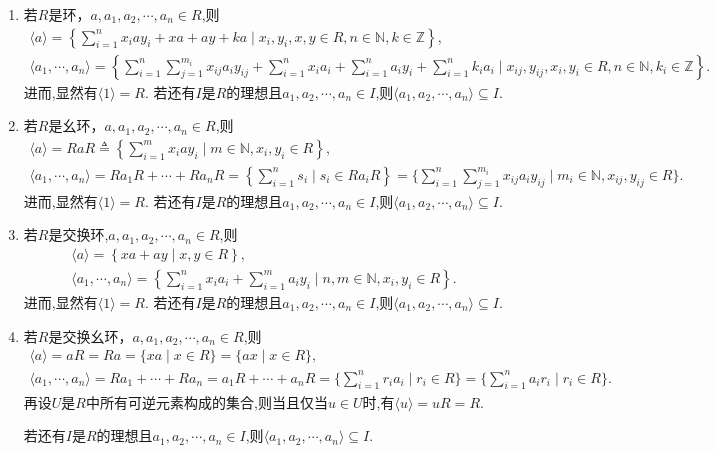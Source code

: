 \documentclass[../../main.tex]{subfiles}%
\begin{document}
\begin{theorem}\label{theorem:主理想和有限生成理想的形状}
\begin{enumerate}[(1)]
\item\label{theorem:主理想和有限生成理想的形状-0} 若$R$是环，$a,a_1,a_2,\cdots,a_n\in R$,则
\begin{gather*}
\langle a \rangle = \left\{ \sum_{i=1}^{n} x_i a y_i + x a + a y + k a \mid x_i, y_i, x, y \in R, n \in \mathbb{N}, k \in \mathbb{Z} \right\},\\
\langle a_1,\cdots ,a_n\rangle =\left\{ \sum_{i=1}^n{\sum_{j=1}^{m_i}{x_{ij}a_iy_{ij}}}+\sum_{i=1}^n{x_ia_i}+\sum_{i=1}^n{a_iy_i}+\sum_{i=1}^n{k_ia_i}\mid x_{ij},y_{ij},x_i,y_i\in R,n\in \mathbb{N} ,k_i\in \mathbb{Z} \right\} .
\end{gather*}
进而,显然有$\langle 1\rangle=R.$
若还有$I$是$R$的理想且$a_1,a_2,\cdots,a_n\in I$,则$\langle a_1,a_2,\cdots,a_n\rangle \subseteq I$.

\item\label{theorem:主理想和有限生成理想的形状-1} 若$R$是幺环，$a,a_1,a_2,\cdots,a_n\in R$,则
\begin{gather*}
\langle a\rangle =RaR\triangleq \left\{ \sum_{i=1}^m{x_iay_i}\mid m\in \mathbb{N},x_i,y_i\in R \right\} ,\\
\langle a_1,\cdots ,a_n\rangle =Ra_1R+\cdots +Ra_nR=\left\{ \sum_{i=1}^n{s_i}\mid s_i\in Ra_iR \right\} =\{\sum_{i=1}^n{\sum_{j=1}^{m_i}{x_{ij}a_iy_{ij}}}\mid m_i\in \mathbb{N},x_{ij},y_{ij}\in R\}.
\end{gather*}
进而,显然有$\langle 1\rangle=R.$
若还有$I$是$R$的理想且$a_1,a_2,\cdots,a_n\in I$,则$\langle a_1,a_2,\cdots,a_n\rangle \subseteq I$.

\item 若$R$是交换环,$a,a_1,a_2,\cdots,a_n\in R$,则
\begin{gather*}
\langle a\rangle =\left\{ xa+ay\mid x,y\in R \right\} ,
\\
\langle a_1,\cdots ,a_n\rangle =\left\{ \sum_{i=1}^n{x_ia_i}+\sum_{i=1}^m{a_iy_i}\mid n,m\in \mathbb{N} ,x_i,y_i\in R \right\} .
\end{gather*}
进而,显然有$\langle 1\rangle=R.$
若还有$I$是$R$的理想且$a_1,a_2,\cdots,a_n\in I$,则$\langle a_1,a_2,\cdots,a_n\rangle \subseteq I$.

\item\label{theorem:主理想和有限生成理想的形状-2} 若$R$是交换幺环，$a,a_1,a_2,\cdots,a_n\in R$,则
\begin{gather*}
\langle a \rangle=aR=Ra=\{x a \mid x \in R\}=\{ax \mid x \in R\},
\\
\langle a_1,\cdots ,a_n\rangle =Ra_1+\cdots +Ra_n=a_1R+\cdots +a_nR=\{\sum_{i=1}^n{r_ia_i}\mid r_i\in R\}
=\{\sum_{i=1}^n{a_ir_i}\mid r_i\in R\}.
\end{gather*}
再设$U$是$R$中所有可逆元素构成的集合,则当且仅当$u\in U$时,有$\langle u\rangle=uR=R.$

若还有$I$是$R$的理想且$a_1,a_2,\cdots,a_n\in I$,则$\langle a_1,a_2,\cdots,a_n\rangle \subseteq I$.
\end{enumerate}
\end{theorem}
\end{document}
